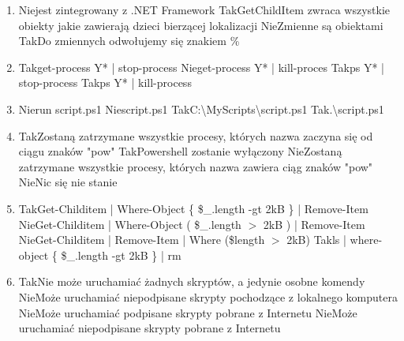 \begin{enumerate}
		\newpage
		\item {}%
		{Nie}{jest zintegrowany z .NET Framework}%
		{Tak}{GetChildItem zwraca wszystkie obiekty jakie zawierają dzieci bierzącej lokalizacji}%
		{Nie}{Zmienne są obiektami}%
		{Tak}{Do zmiennych odwołujemy się znakiem \%}
		\item {}%
		{Tak}{get-process Y* | stop-process}%
		{Nie}{get-process Y* | kill-proces}%
		{Tak}{ps Y* | stop-process}%
		{Tak}{ps Y* | kill-process}
		\item {}%
		{Nie}{run script.ps1}%
		{Nie}{script.ps1}%
		{Tak}{C:\textbackslash MyScripts\textbackslash script.ps1}%
		{Tak}{.\textbackslash script.ps1}
		\item {}%
		{Tak}{Zostaną zatrzymane wszystkie procesy, których nazwa zaczyna się od ciągu znaków "pow"}%
		{Tak}{Powershell zostanie wyłączony}%
		{Nie}{Zostaną zatrzymane wszystkie procesy, których nazwa zawiera ciąg znaków "pow"}%
		{Nie}{Nic się nie stanie}
		\item {}%
		{Tak}{Get-Childitem | Where-Object \{ \$\_.length -gt 2kB \} | Remove-Item}%
		{Nie}{Get-Childitem | Where-Object ( \$\_.length $ > $ 2kB ) | Remove-Item}%
		{Nie}{Get-Childitem | Remove-Item | Where (\$length $ > $ 2kB)}%
		{Tak}{ls | where-object \{ \$\_.length -gt 2kB \} | rm}
		\item {}%
		{Tak}{Nie może uruchamiać żadnych skryptów, a jedynie osobne komendy}%
		{Nie}{Może uruchamiać niepodpisane skrypty pochodzące z lokalnego komputera}%
		{Nie}{Może uruchamiać podpisane skrypty pobrane z Internetu}%
		{Nie}{Może uruchamiać niepodpisane skrypty pobrane z Internetu}
		

\end{enumerate}

